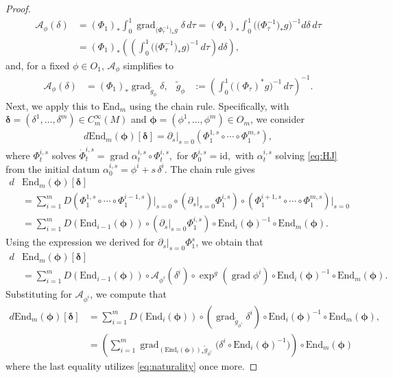 \documentclass{article}
\theoremstyle{remark}
\newcommand{\M}{M}
\newcommand{\CinfV}[1]{C_{#1}^{\infty}(\M)}
\DeclareMathOperator{\grad}{\mathrm{grad}}
\begin{document}
\begin{proof}
\begin{align*}
    \mathcal{A}_{\phi}(\delta) &= (\Phi_1)_*\int_0^1 \grad_{\big(\Phi_\tau^{-1}\big)_*g} \delta  \,d\tau =  (\Phi_1)_*\int_0^1 \big(\big(\Phi_\tau^{-1}\big)_*g\big)^{-1} d\delta  \,d\tau\\
    &=  (\Phi_1)_*\left(\left(\int_0^1 \big(\big(\Phi_\tau^{-1}\big)_*g\big)^{-1} \,d\tau\right) d\delta\right),
\end{align*}
%
and, for a fixed $\phi\in O_1$, $\mathcal{A}_{\phi}$ simplifies to
%
\begin{align*}
    \mathcal{A}_{\phi}(\delta) &= (\Phi_1)_*\grad_{\tilde{g}_\phi} \delta, & \tilde{g}_\phi &:= \left(\int_0^1 \big((\Phi_\tau)^*g\big)^{-1}\,d\tau\right)^{-1}.
\end{align*}
%
Next, we apply this to $\mathrm{End}_{m}$ using the chain rule. Specifically, with $\bm{\delta}=(\delta^{1},\dots,\delta^{m})\in\CinfV{m}$ and $\bm{\phi}=(\phi^1,\dots,\phi^m)\in O_m$, we consider
%
\begin{align*}
    d\mathrm{End}_{m}(\bm{\phi})[\bm{\delta}] = \partial_{s}|_{{s}=0}\left(\Phi_1^{1,{s}}\circ \cdots\circ \Phi_1^{m,{s}}\right), 
\end{align*}
%
where $\Phi_t^{i,{s}}$ solves 
%
$
\dot{\Phi}_t^{i,{s}} = \grad\alpha_t^{i,{s}} \circ \Phi_t^{i,{s}},$ for $\Phi_0^{i,{s}}=\mathrm{id}, 
$
%
with $\alpha_t^{i,{s}}$ solving \eqref{eq:HJ} from the initial datum $\alpha_0^{i,{s}}=\phi^i + {s}\,\delta^{i}$. 
The chain rule gives
%
\begin{align*}
    d&\mathrm{End}_{m}(\bm{\phi})[\bm{\delta}]\\
    &= \sum_{i=1}^{m}D\left(\Phi_1^{1,{s}}\circ \cdots\circ \Phi_1^{i-1,{s}}\right)\Big|_{{s}=0}\circ\left(\partial_{s}|_{{s}=0} \Phi_1^{i,{s}}\right) \circ \left(\Phi_1^{i+1,{s}}\circ \cdots\circ \Phi_1^{m,{s}}\right)\Big|_{{s}=0}\\ 
    & =\sum_{i=1}^{m}D(\mathrm{End}_{i-1}(\bm{\phi}))\circ\left(\partial_{s}|_{{s}=0} \Phi_1^{i,{s}} \right)\circ \mathrm{End}_{i}(\bm{\phi})^{-1}\circ \mathrm{End}_{m}(\bm{\phi}).
\end{align*}
%
Using the expression we derived for $\partial_{s}|_{{s} =0}\Phi^{s}_1$, we obtain that
%
\begin{align*}
    d&\mathrm{End}_{m}(\bm{\phi})[\bm{\delta}]\\
    &= \sum_{i=1}^{m}D(\mathrm{End}_{i-1}(\bm{\phi}))\circ\mathcal{A}_{\phi^i}(\delta^{i})\circ\exp^g(\grad\phi^i)\circ \mathrm{End}_{i}(\bm{\phi})^{-1}\circ \mathrm{End}_{m}(\bm{\phi}).
\end{align*}
%
Substituting for $\mathcal{A}_{\phi^i}$, we compute that
%
\begin{align*}
    d\mathrm{End}_{m}(\bm{\phi})[\bm{\delta}] &= \sum_{i=1}^{m}D(\mathrm{End}_{i}(\bm{\phi}))\circ (\grad_{\tilde{g}_{\phi^i}} \delta^i)\circ \mathrm{End}_{i}(\bm{\phi})^{-1}\circ \mathrm{End}_{m}(\bm{\phi}), \\
    &=\left(\sum_{i=1}^{m} \grad_{(\mathrm{End}_{i}(\bm{\phi}))_*\tilde{g}_{\phi^i}}\big( \delta^i\circ \mathrm{End}_{i}(\bm{\phi})^{-1}\big)\right)\circ \mathrm{End}_{m}(\bm{\phi})
\end{align*}
%
where the last equality utilizes \eqref{eq:naturality} once more.
\end{proof}
%
\end{document}
